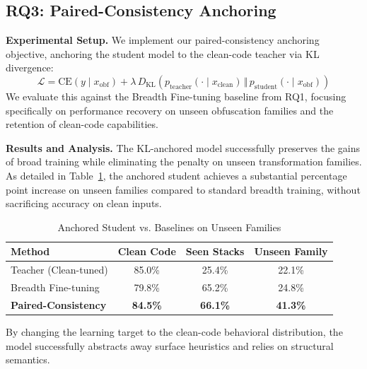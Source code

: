 \subsection{RQ3: Paired-Consistency Anchoring}
\label{subsec:rq3}

\textbf{Experimental Setup.} We implement our paired-consistency anchoring objective, anchoring the student model to the clean-code teacher via KL divergence:
\begin{equation}
\mathcal{L} = \mathrm{CE}\!\left(y \mid x_{\mathrm{obf}}\right) + \lambda\, D_{\mathrm{KL}}\!\left( p_{\mathrm{teacher}}(\cdot \mid x_{\mathrm{clean}}) \,\Vert\, p_{\mathrm{student}}(\cdot \mid x_{\mathrm{obf}}) \right)
\end{equation}
We evaluate this against the Breadth Fine-tuning baseline from RQ1, focusing specifically on performance recovery on unseen obfuscation families and the retention of clean-code capabilities.

\textbf{Results and Analysis.} The KL-anchored model successfully preserves the gains of broad training while eliminating the penalty on unseen transformation families. As detailed in Table~\ref{tab:rq3_kl_results}, the anchored student achieves a substantial percentage point increase on unseen families compared to standard breadth training, without sacrificing accuracy on clean inputs.

\begin{table}[h]
\centering
\caption{Anchored Student vs. Baselines on Unseen Families}
\label{tab:rq3_kl_results}
\begin{tabular}{@{}lccc@{}}
\toprule
\textbf{Method}             & \textbf{Clean Code} & \textbf{Seen Stacks} & \textbf{Unseen Family} \\ \midrule
Teacher (Clean-tuned)       & 85.0\%              & 25.4\%               & 22.1\%                 \\
Breadth Fine-tuning         & 79.8\%              & 65.2\%               & 24.8\%                 \\
\textbf{Paired-Consistency} & \textbf{84.5\%}     & \textbf{66.1\%}      & \textbf{41.3\%}        \\ \bottomrule
\end{tabular}
\end{table}

By changing the learning target to the clean-code behavioral distribution, the model successfully abstracts away surface heuristics and relies on structural semantics.